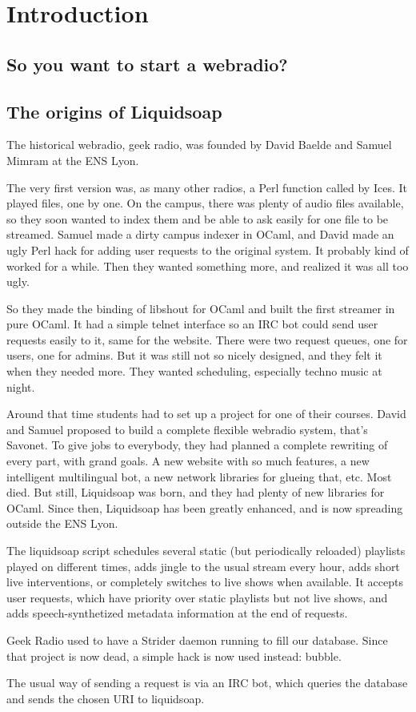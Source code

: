 \chapter{Introduction}
\section{So you want to start a webradio?}

\section{The origins of Liquidsoap}
The historical webradio, geek radio, was founded by David Baelde and Samuel
Mimram at the ENS Lyon.

The very first version was, as many other radios, a Perl function called by
Ices. It played files, one by one. On the campus, there was plenty of audio
files available, so they soon wanted to index them and be able to ask easily for
one file to be streamed. Samuel made a dirty campus indexer in OCaml, and David
made an ugly Perl hack for adding user requests to the original system. It
probably kind of worked for a while. Then they wanted something more, and
realized it was all too ugly.

So they made the binding of libshout for OCaml and built the first streamer in
pure OCaml. It had a simple telnet interface so an IRC bot could send user
requests easily to it, same for the website. There were two request queues, one
for users, one for admins. But it was still not so nicely designed, and they
felt it when they needed more. They wanted scheduling, especially techno music
at night.

Around that time students had to set up a project for one of their
courses. David and Samuel proposed to build a complete flexible webradio system,
that's Savonet. To give jobs to everybody, they had planned a complete rewriting
of every part, with grand goals. A new website with so much features, a new
intelligent multilingual bot, a new network libraries for glueing that,
etc. Most died. But still, Liquidsoap was born, and they had plenty of new
libraries for OCaml. Since then, Liquidsoap has been greatly enhanced, and is
now spreading outside the ENS Lyon.

The liquidsoap script schedules several static (but periodically reloaded)
playlists played on different times, adds jingle to the usual stream every hour,
adds short live interventions, or completely switches to live shows when
available. It accepts user requests, which have priority over static playlists
but not live shows, and adds speech-synthetized metadata information at the end
of requests.

Geek Radio used to have a Strider daemon running to fill our database. Since
that project is now dead, a simple hack is now used instead: bubble.

The usual way of sending a request is via an IRC bot, which queries the database
and sends the chosen URI to liquidsoap.

